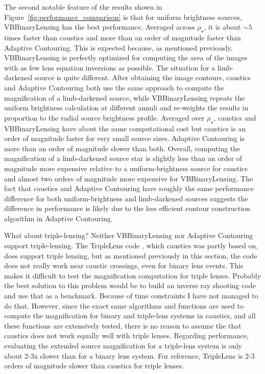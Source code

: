\documentclass[12pt,dvipsnames]{report}
\newcommand{\ssf}[1]{\textsf{#1}}
\begin{document}
The second notable feature of the results shown in Figure~\ref{fig:performance_comparison}
is that for uniform brightness sources, \ssf{VBBinaryLensing} has the best performance.
Averaged across $\rho_\star$, it is about $\sim 5$ times faster than \ssf{caustics} and 
more than an order of magnitude faster than \ssf{Adaptive Contouring}. This is expected
because, as mentioned previously, \ssf{VBBinaryLensing} is perfectly optimized for 
computing the area of the images with as few lens equation inversions as possible. 
The situation for a limb-darkened source is quite different. After obtaining the 
image contours, \ssf{caustics} and \ssf{Adaptive Contouring} both use the same approach 
to compute the magnification of a limb-darkened source, while \ssf{VBBinaryLensing} repeats
the uniform brightness calculation at different annuli and re-weights the results in proportion to 
the radial source brightness profile. Averaged over $\rho_\star$, \ssf{caustics} and 
\ssf{VBBinaryLensing} have about the same computational cost but \ssf{caustics} is an order 
of magnitude faster for very small source sizes. \ssf{Adaptive Contouring} is more than an 
order of magnitude slower than both. Overall, computing the magnification of a limb-darkened 
source star is slightly less than an order of magnitude more expensive relative to 
a uniform-brightness source for \ssf{caustics} and almost two orders of magnitude more 
expensive for \ssf{VBBinaryLensing}. 
The fact that \ssf{caustics} and \ssf{Adaptive Contouring} have roughly the same performance 
difference for both uniform-brightness and limb-darkened sources suggests the difference 
in performance is likely due to the less efficient contour construction algorithm  in 
\ssf{Adaptive Contouring}.

What about triple-lensing? Neither \ssf{VBBinaryLensing} nor \ssf{Adaptive Contouring} 
support triple-lensing. The \ssf{TripleLens} code \citep{2021MNRAS.503.6143K}, which 
\ssf{caustics} was partly based on, does support triple 
lensing, but as mentioned previously in this section, the code does not really work
near caustic crossings, even for binary lens events. 
This makes it difficult to test the magnification computation for triple lenses. Probably 
the best solution to this problem would be to build an inverse ray shooting code and use that
as a benchmark. Because of time constraints I have not managed to do that. 
However, since the exact same algorithms and functions are 
used to compute the magnification for binary and triple-lens systems in \ssf{caustics},
and all these functions are extensively tested, there is no reason to assume the that 
\ssf{caustics} does not work equally well with triple lenses. 
Regarding performance, evaluating the extended source magnification for a triple-lens system 
is only about 2-3x slower than for a binary lens system. 
For reference, \ssf{TripleLens} is 2-3 orders of magnitude slower than \ssf{caustics} for 
triple lenses.
\end{document}
